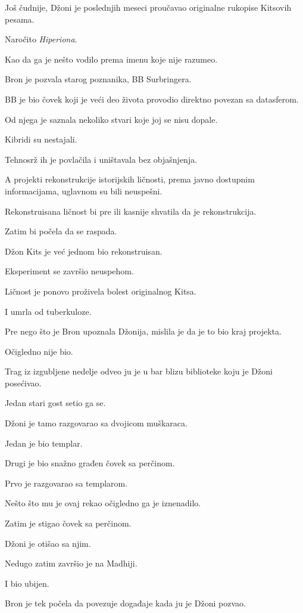 Još čudnije, Džoni je poslednjih meseci proučavao originalne rukopise Kitsovih pesama.

Naročito \emph{Hiperiona}.

Kao da ga je nešto vodilo prema imenu koje nije razumeo.

\bigskip

Bron je pozvala starog poznanika, BB Surbringera.

BB je bio čovek koji je veći deo života provodio direktno povezan sa datasferom.

Od njega je saznala nekoliko stvari koje joj se nisu dopale.

Kibridi su nestajali.

Tehnosrž ih je povlačila i uništavala bez objašnjenja.

A projekti rekonstrukcije istorijskih ličnosti, prema javno dostupnim informacijama, uglavnom su bili neuspešni.

Rekonstruisana ličnost bi pre ili kasnije shvatila da je rekonstrukcija.

Zatim bi počela da se raspada.

Džon Kits je već jednom bio rekonstruisan.

Eksperiment se završio neuspehom.

Ličnost je ponovo proživela bolest originalnog Kitsa.

I umrla od tuberkuloze.

Pre nego što je Bron upoznala Džonija, mislila je da je to bio kraj projekta.

Očigledno nije bio.

\bigskip

Trag iz izgubljene nedelje odveo ju je u bar blizu biblioteke koju je Džoni posećivao.

Jedan stari gost setio ga se.

Džoni je tamo razgovarao sa dvojicom muškaraca.

Jedan je bio templar.

Drugi je bio snažno građen čovek sa perčinom.

Prvo je razgovarao sa templarom.

Nešto što mu je ovaj rekao očigledno ga je iznenadilo.

Zatim je stigao čovek sa perčinom.

Džoni je otišao sa njim.

Nedugo zatim završio je na Madhiji.

I bio ubijen.

Bron je tek počela da povezuje događaje kada ju je Džoni pozvao.

